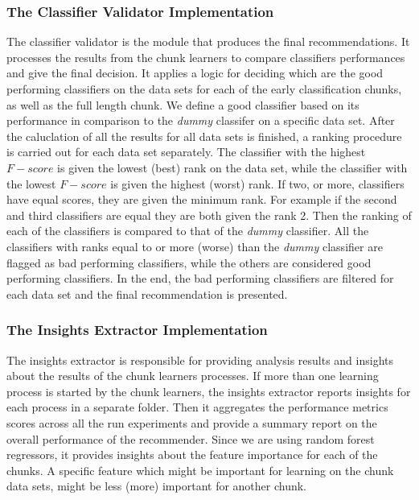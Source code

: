 \subsubsection*{The Classifier Validator Implementation}
\label{ClassifierValidatorImplementation}
The classifier validator is the module that produces the final recommendations. It processes the results from the chunk learners to compare classifiers performances and give the final decision.
It applies a logic for deciding which are the good performing classifiers on the data sets for each of the early classification chunks, as well as the full length chunk.
We define a good classifier based on its performance in comparison to the \emph{dummy} classifer on a specific data set.
After the caluclation of all the results for all data sets is finished, a ranking procedure is carried out for each data set separately.
The classifier with the highest $F-score$ is given the lowest (best) rank on the data set, while the classifier with the lowest $F-score$ is given the highest (worst) rank.
If two, or more, classifiers have equal scores, they are given the minimum rank. For example if the second and third classifiers are equal they are both given the rank 2.
Then the ranking of each of the classifiers is compared to that of the \emph{dummy} classifier.
All the classifiers with ranks equal to or more (worse) than the \emph{dummy} classifier are flagged as bad performing classifiers, while the others are considered good performing classifiers.
In the end, the bad performing classifiers are filtered for each data set and the final recommendation is presented.

\subsubsection*{The Insights Extractor Implementation}
\label{InsightsExtractorImplementation}
The insights extractor is responsible for providing analysis results and insights about the results of the chunk learners processes.
If more than one learning process is started by the chunk learners, the insights extractor reports insights for each process in a separate folder.
Then it aggregates the performance metrics scores across all the run experiments and provide a summary report on the overall performance of the recommender.
Since we are using random forest regressors, it provides insights about the feature importance for each of the chunks.
A specific feature which might be important for learning on the  chunk data sets, might be less (more) important for another chunk.